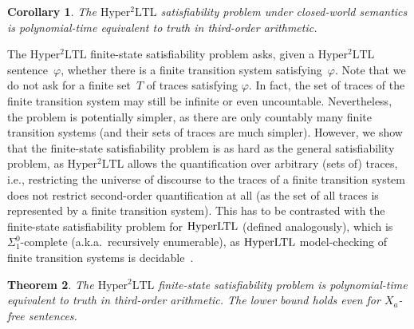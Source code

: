 \documentclass[dvipsnames,10pt,a4paper]{amsart}
\newtheorem{thm}{Theorem}[section]
\newtheorem{cor}[thm]{Corollary}
\theoremstyle{definition}
\theoremstyle{remark}
\renewcommand{\phi}{\varphi}
\newcommand{\hyltl}{\mathrm{Hyper\-LTL}\xspace}
\newcommand{\sohyltl}{\mathrm{Hyper^2LTL}\xspace}
\newcommand{\univar}{X_a}
\begin{document}
\begin{cor}
\label{cor_satcomplexity_cw}
The $\sohyltl$ satisfiability problem under closed-world semantics is polynomial-time equivalent to truth in third-order arithmetic.
\end{cor}

The $\sohyltl$ finite-state satisfiability problem asks, given a $\sohyltl$ sentence~$\phi$, whether there is a finite transition system satisfying~$\phi$.
Note that we do not ask for a finite set~$T$ of traces satisfying $\phi$. In fact, the set of traces of the finite transition system may still be infinite or even uncountable. 
Nevertheless, the problem is potentially simpler, as there are only countably many finite transition systems (and their sets of traces are much simpler).
However, we show that the finite-state satisfiability problem is as hard as the general satisfiability problem, as $\sohyltl$ allows the quantification over arbitrary (sets of) traces, i.e., restricting the universe of discourse to the traces of a finite transition system does not restrict second-order quantification at all (as the set of all traces is represented by a finite transition system).
This has to be contrasted with the finite-state satisfiability problem for $\hyltl$ (defined analogously), which is $\Sigma_1^0$-complete (a.k.a.\ recursively enumerable), as $\hyltl$ model-checking of finite transition systems is decidable~\cite{ClarksonFKMRS14}.

\begin{thm}
\label{thm_finsatcomplexity}
The $\sohyltl$ finite-state satisfiability problem is polynomial-time equivalent to truth in third-order arithmetic. The lower bound holds even for $\univar$-free sentences.
\end{thm}
\end{document}

